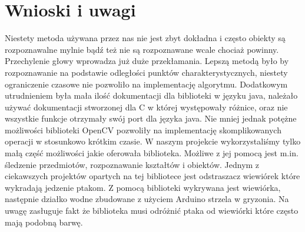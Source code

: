 \section{Wnioski i uwagi}
Niestety metoda używana przez nas nie jest zbyt dokładna i często obiekty są rozpoznawalne mylnie bądź też nie są rozpoznawane wcale chociaż powinny. Przechylenie głowy wprowadza już duże przekłamania. Lepszą metodą było by rozpoznawanie na podstawie odległości punktów charakterystycznych, niestety ograniczenie czasowe nie pozwoliło na implementację algorytmu. Dodatkowym utrudnieniem była mała ilość dokumentacji dla biblioteki w języku java, należało używać dokumentacji stworzonej dla C w której występowały różnice, oraz nie wszystkie funkcje otrzymały swój port dla języka java. Nie mniej jednak potężne możliwości biblioteki OpenCV pozwoliły na implementację skomplikowanych operacji w stosunkowo krótkim czasie. W naszym projekcie wykorzystaliśmy tylko małą część możliwości jakie oferowała biblioteka. Możliwe z jej pomocą jest m.in. śledzenie przedmiotów, rozpoznawanie kształtów i obiektów. Jednym z ciekawszych projektów opartych na tej bibliotece jest odstraszacz wiewiórek które wykradają jedzenie ptakom. Z pomocą biblioteki wykrywana jest wiewiórka, następnie działko wodne zbudowane z użyciem Arduino strzela w gryzonia. Na uwagę zasługuje fakt że biblioteka musi odróżnić ptaka od wiewiórki które często mają podobną barwę.

